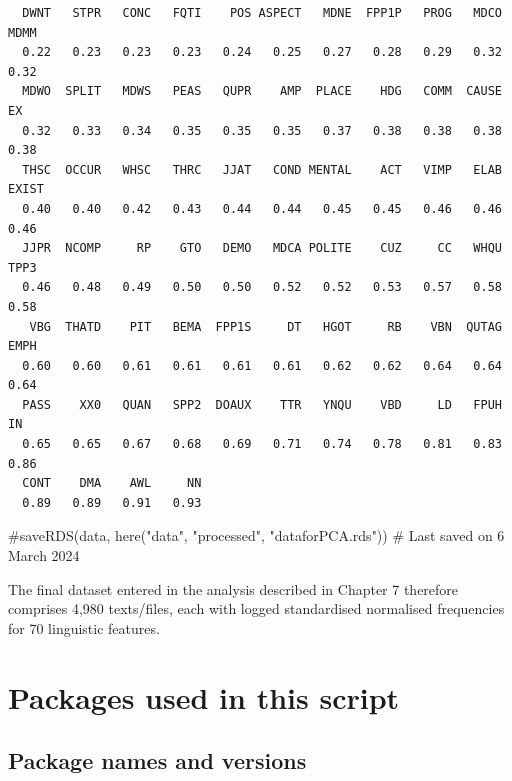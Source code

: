 \documentclass[
  letterpaper,
  DIV=11,
  numbers=noendperiod]{scrreprt}
\newenvironment{Shaded}{\begin{snugshade}}{\end{snugshade}}
\newcommand{\CommentTok}[1]{\textcolor[rgb]{0.37,0.37,0.37}{#1}}
\begin{document}
\begin{verbatim}
  DWNT   STPR   CONC   FQTI    POS ASPECT   MDNE  FPP1P   PROG   MDCO   MDMM 
  0.22   0.23   0.23   0.23   0.24   0.25   0.27   0.28   0.29   0.32   0.32 
  MDWO  SPLIT   MDWS   PEAS   QUPR    AMP  PLACE    HDG   COMM  CAUSE     EX 
  0.32   0.33   0.34   0.35   0.35   0.35   0.37   0.38   0.38   0.38   0.38 
  THSC  OCCUR   WHSC   THRC   JJAT   COND MENTAL    ACT   VIMP   ELAB  EXIST 
  0.40   0.40   0.42   0.43   0.44   0.44   0.45   0.45   0.46   0.46   0.46 
  JJPR  NCOMP     RP    GTO   DEMO   MDCA POLITE    CUZ     CC   WHQU   TPP3 
  0.46   0.48   0.49   0.50   0.50   0.52   0.52   0.53   0.57   0.58   0.58 
   VBG  THATD    PIT   BEMA  FPP1S     DT   HGOT     RB    VBN  QUTAG   EMPH 
  0.60   0.60   0.61   0.61   0.61   0.61   0.62   0.62   0.64   0.64   0.64 
  PASS    XX0   QUAN   SPP2  DOAUX    TTR   YNQU    VBD     LD   FPUH     IN 
  0.65   0.65   0.67   0.68   0.69   0.71   0.74   0.78   0.81   0.83   0.86 
  CONT    DMA    AWL     NN 
  0.89   0.89   0.91   0.93 
\end{verbatim}

\begin{Shaded}
\begin{Highlighting}[]
\CommentTok{\#saveRDS(data, here("data", "processed", "dataforPCA.rds")) \# Last saved on 6 March 2024}
\end{Highlighting}
\end{Shaded}

The final dataset entered in the analysis described in Chapter 7
therefore comprises 4,980 texts/files, each with logged standardised
normalised frequencies for 70 linguistic features.

\section{Packages used in this
script}\label{packages-used-in-this-script-3}

\subsection{Package names and
versions}\label{package-names-and-versions-3}
\end{document}
